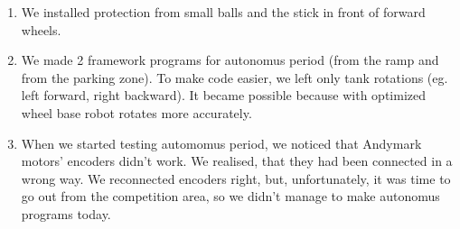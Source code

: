 \begin{enumerate}
	\item We installed protection from small balls and the stick in front of forward wheels.
	
	\item We made 2 framework programs for autonomus period (from the ramp and from the parking zone). To make code easier, we left only tank rotations (eg. left forward, right backward). It became possible because with optimized wheel base robot rotates more accurately.
	
	\item When we started testing automomus period, we noticed that Andymark motors' encoders didn't work. We realised, that they had been connected in a wrong way. We reconnected encoders right, but, unfortunately, it was time to go out from the competition area, so we didn't manage to make autonomus programs today.
	
\end{enumerate}
\fillpage
